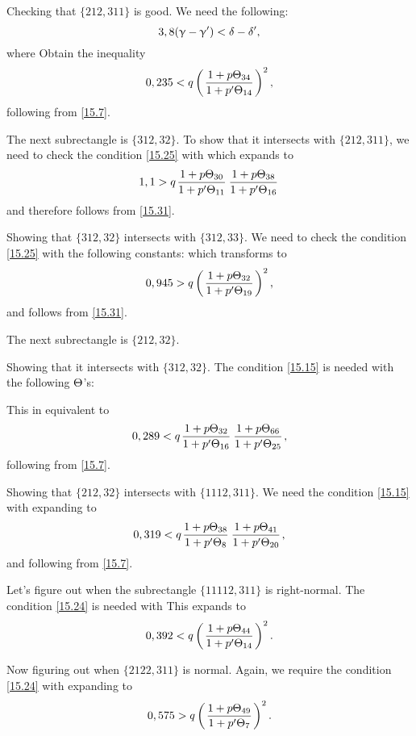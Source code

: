 Checking that $\{212, 311\}$ is good.
We need the following:
\begin{equation*}
	3,8 (\upgamma - \upgamma') < \delta - \delta',
\end{equation*}
where
Obtain the inequality
\begin{equation*}
	0,235 < q \left(\mkern 2mu \dfrac{1 + {p} \Theta_{34}}{1 + {p'} \Theta_{14}} \mkern 2mu\right)^2,
\end{equation*}
following from \ref{15.7}.

The next subrectangle is $\{312, 32\}$.
To show that it intersects with $\{212, 311\}$,
we need to check the condition \ref{15.25} with
which expands to
\begin{equation*}
	1,1 > q \up{30}{11} \up{38}{16}
\end{equation*}
and therefore follows from \ref{15.31}.

Showing that $\{312, 32\}$ intersects with $\{312, 33\}$.
We need to check the condition \ref{15.25} with the following constants:
which transforms to
\begin{equation*}
	0,945 > q \left(\mkern 2mu \dfrac{1 + {p} \Theta_{32}}{1 + {p'} \Theta_{19}} \mkern 2mu\right)^2,
\end{equation*}
and follows from \ref{15.31}.

The next subrectangle is $\{212, 32\}$.

Showing that it intersects with $\{312, 32\}$.
The condition \ref{15.15} is needed with the following $\Theta$'s:

This in equivalent to
\begin{equation*}
	0,289 < q \up{32}{16} \up{66}{25},
\end{equation*}
following from \ref{15.7}.

Showing that $\{212, 32\}$ intersects with $\{1112, 311\}$.
We need the condition \ref{15.15} with
expanding to
\begin{equation*}
	0,319 < q \up{38}{8} \up{41}{20},
\end{equation*}
and following from \ref{15.7}.

Let's figure out when the subrectangle $\{11112, 311\}$ is right-normal.
The condition \ref{15.24} is needed with
This expands to
\begin{equation}\label{15.44}
	0,392 < q \left(\mkern 2mu \dfrac{1 + {p} \Theta_{44}}{1 + {p'} \Theta_{14}} \mkern 2mu\right)^2.
\end{equation}

Now figuring out when $\{2122,311\}$ is normal.
Again, we require the condition \ref{15.24} with
expanding to
\begin{equation}\label{15.45}
	0,575 > q \left(\mkern 2mu \dfrac{1 + {p} \Theta_{49}}{1 + {p'} \Theta_{7}} \mkern 2mu\right)^2.
\end{equation}


